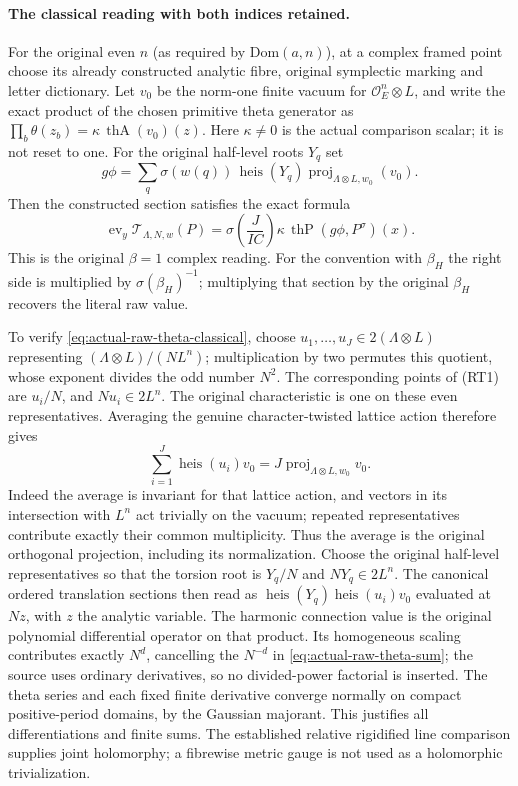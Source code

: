 \paragraph{The classical reading with both indices retained.}
For the original even $n$ (as required by $\mathrm{Dom}(a,n)$),
at a complex framed point choose its already constructed
analytic fibre, original symplectic marking and letter dictionary.
Let $v_0$ be the norm-one finite vacuum for
$\mathcal O_E^n\otimes L$, and write the exact product of the
chosen primitive theta generator as
$\prod_b\theta(z_b)=\kappa\,\operatorname{thA}(v_0)(z)$.
Here $\kappa\ne0$ is the actual comparison scalar; it is not
reset to one.  For the original half-level roots $Y_q$ set
\[
 g\phi=\sum_q\sigma(w(q))\,\operatorname{heis}(Y_q)
             \operatorname{proj}_{\Lambda\otimes L,w_0}(v_0).
\]
Then the constructed section satisfies the exact formula
\begin{equation}\label{eq:actual-raw-theta-classical}
 \operatorname{ev}_y\mathcal T_{\Lambda,N,w}(P)
   =\sigma\!\left(\frac{J}{IC}\right)\kappa\,
             \operatorname{thP}(g\phi,P^\sigma)(x).
\end{equation}
This is the original $\beta=1$ complex reading.
For the convention with $\beta_H$ the right side is multiplied
by $\sigma(\beta_H)^{-1}$; multiplying that section by the
original $\beta_H$ recovers the literal raw value.

To verify \eqref{eq:actual-raw-theta-classical}, choose
$u_1,\ldots,u_J\in2(\Lambda\otimes L)$ representing
$(\Lambda\otimes L)/(NL^n)$; multiplication by two permutes
this quotient, whose exponent divides the odd number $N^2$.
The corresponding points of \textup{(RT1)} are $u_i/N$,
and $Nu_i\in2L^n$.  The original characteristic is one
on these even representatives.  Averaging the genuine
character-twisted lattice action therefore gives
\[
 \sum_{i=1}^J\operatorname{heis}(u_i)v_0
       =J\operatorname{proj}_{\Lambda\otimes L,w_0}v_0.
\]
Indeed the average is invariant for that lattice action, and
vectors in its intersection with $L^n$ act trivially on the
vacuum; repeated representatives contribute exactly their
common multiplicity.  Thus the average is the original
orthogonal projection, including its normalization.
Choose the original half-level representatives so that the
torsion root is $Y_q/N$ and $NY_q\in2L^n$.
The canonical ordered translation sections then read as
$\operatorname{heis}(Y_q)\operatorname{heis}(u_i)v_0$
evaluated at $Nz$, with $z$ the analytic variable.
The harmonic connection value is the original
polynomial differential operator on that product.  Its
homogeneous scaling contributes exactly $N^d$, cancelling the
$N^{-d}$ in \eqref{eq:actual-raw-theta-sum}; the source uses
ordinary derivatives, so no divided-power factorial is inserted.
The theta series and each fixed finite derivative converge
normally on compact positive-period domains, by the Gaussian
majorant.  This justifies all differentiations and finite sums.
The established relative rigidified line comparison supplies
joint holomorphy; a fibrewise metric gauge is not used as a
holomorphic trivialization.\cite{raw-theta-source}

